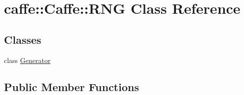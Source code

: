 \hypertarget{classcaffe_1_1_caffe_1_1_r_n_g}{}\section{caffe\+:\+:Caffe\+:\+:R\+NG Class Reference}
\label{classcaffe_1_1_caffe_1_1_r_n_g}
\subsection*{Classes}
\begin{DoxyCompactItemize}
\item 
class \mbox{\hyperlink{classcaffe_1_1_caffe_1_1_r_n_g_1_1_generator}{Generator}}
\end{DoxyCompactItemize}
\subsection*{Public Member Functions}
